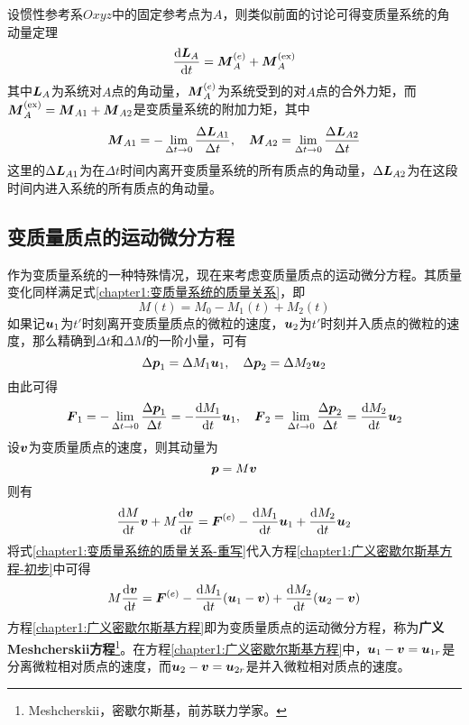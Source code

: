 设惯性参考系$Oxyz$中的固定参考点为$A$，则类似前面的讨论可得变质量系统的角动量定理
\begin{equation}
	\dfrac{\mathrm{d} \boldsymbol{L}_A}{\mathrm{d} t} = \boldsymbol{M}_A^{(e)} + \boldsymbol{M}_A^{(\text{ex})}
\end{equation}
其中$\boldsymbol{L}_A$为系统对$A$点的角动量，$\boldsymbol{M}_A^{(e)}$为系统受到的对$A$点的合外力矩，而$\boldsymbol{M}_A^{(\text{ex})} = \boldsymbol{M}_{A1} + \boldsymbol{M}_{A2}$是变质量系统的附加力矩，其中
\begin{equation}
	\boldsymbol{M}_{A1} = -\lim_{\Delta t\to 0} \frac{\Delta \boldsymbol{L}_{A1}}{\Delta t},\quad \boldsymbol{M}_{A2} =  \lim_{\Delta t\to 0} \frac{\Delta \boldsymbol{L}_{A2}}{\Delta t}
\end{equation}
这里的$\Delta \boldsymbol{L}_{A1}$为在$\Delta t$时间内离开变质量系统的所有质点的角动量，$\Delta \boldsymbol{L}_{A2}$为在这段时间内进入系统的所有质点的角动量。

\subsection{变质量质点的运动微分方程}

作为变质量系统的一种特殊情况，现在来考虑变质量质点的运动微分方程。其质量变化同样满足式\eqref{chapter1:变质量系统的质量关系}，即
\begin{equation}
	M(t) = M_0 - M_1(t) + M_2(t)
	\label{chapter1:变质量系统的质量关系-重写}
\end{equation}
如果记$\boldsymbol{u}_1$为$t'$时刻离开变质量质点的微粒的速度，$\boldsymbol{u}_2$为$t'$时刻并入质点的微粒的速度，那么精确到$\Delta t$和$\Delta M$的一阶小量，可有
\begin{equation}
	\Delta \boldsymbol{p}_1 = \Delta M_1\boldsymbol{u}_1,\quad \Delta \boldsymbol{p}_2 = \Delta M_2\boldsymbol{u}_2
\end{equation}	
由此可得
\begin{equation}
	\boldsymbol{F}_1 = -\lim_{\Delta t\to 0} \frac{\Delta \boldsymbol{p}_1}{\Delta t} = -\dfrac{\mathrm{d} M_1}{\mathrm{d} t}\boldsymbol{u}_1,\quad \boldsymbol{F}_2 = \lim_{\Delta t\to 0} \frac{\Delta \boldsymbol{p}_2}{\Delta t} = \dfrac{\mathrm{d} M_2}{\mathrm{d} t}\boldsymbol{u}_2
\end{equation}
设$\boldsymbol{v}$为变质量质点的速度，则其动量为
\begin{equation}
	\boldsymbol{p} = M\boldsymbol{v}
\end{equation}
则有
\begin{equation}
	\dfrac{\mathrm{d} M}{\mathrm{d} t}\boldsymbol{v}+M\dfrac{\mathrm{d} \boldsymbol{v}}{\mathrm{d} t} = \boldsymbol{F}^{(e)} - \dfrac{\mathrm{d} M_1}{\mathrm{d} t}\boldsymbol{u}_1 + \dfrac{\mathrm{d} M_2}{\mathrm{d} t}\boldsymbol{u}_2
	\label{chapter1:广义密歇尔斯基方程-初步}
\end{equation}
将式\eqref{chapter1:变质量系统的质量关系-重写}代入方程\eqref{chapter1:广义密歇尔斯基方程-初步}中可得
\begin{equation}
	M\dfrac{\mathrm{d} \boldsymbol{v}}{\mathrm{d} t} = \boldsymbol{F}^{(e)} - \dfrac{\mathrm{d} M_1}{\mathrm{d} t}(\boldsymbol{u}_1-\boldsymbol{v}) + \dfrac{\mathrm{d} M_2}{\mathrm{d} t}(\boldsymbol{u}_2-\boldsymbol{v})
	\label{chapter1:广义密歇尔斯基方程}
\end{equation}
方程\eqref{chapter1:广义密歇尔斯基方程}即为变质量质点的运动微分方程，称为{\bf 广义Meshcherskii方程}\footnote{Meshcherskii，密歇尔斯基，前苏联力学家。}。在方程\eqref{chapter1:广义密歇尔斯基方程}中，$\boldsymbol{u}_1-\boldsymbol{v}=\boldsymbol{u}_{1r}$是分离微粒相对质点的速度，而$\boldsymbol{u}_2-\boldsymbol{v}=\boldsymbol{u}_{2r}$是并入微粒相对质点的速度。

